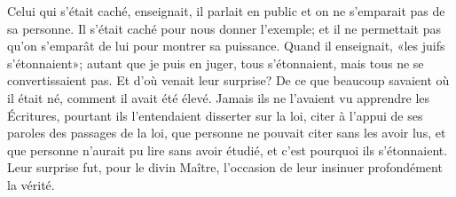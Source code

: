 Celui qui s’était caché, enseignait,
	il parlait en public et on ne s’emparait pas de sa personne.
Il s’était caché pour nous donner l’exemple;
	et il ne permettait pas qu’on s’emparât de lui pour montrer sa puissance.
Quand il enseignait, «les juifs s’étonnaient»;
	autant que je puis en juger, tous s’étonnaient,
	mais tous ne se convertissaient pas.
Et d’où venait leur surprise?
	De ce que beaucoup savaient où il était né,
	comment il avait été élevé.
Jamais ils ne l’avaient vu apprendre les Écritures,
	pourtant ils l’entendaient disserter sur la loi,
	citer à l’appui de ses paroles des passages de la loi,
	que personne ne pouvait citer sans les avoir lus,
	et que personne n’aurait pu lire sans avoir étudié,
	et c’est pourquoi ils s’étonnaient.
Leur surprise fut, pour le divin Maître,
	l’occasion de leur insinuer profondément la vérité.
